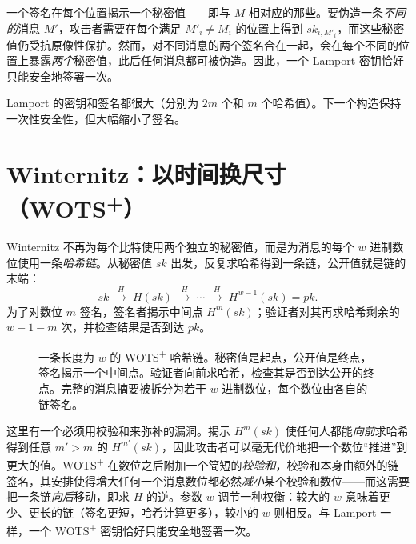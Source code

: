 \begin{remark}[为何它严格只能使用一次]
一个签名在每个位置揭示一个秘密值——即与 $M$ 相对应的那些。要伪造一条\emph{不同的}消息 $M'$，攻击者需要在每个满足 $M'_i\neq M_i$ 的位置上得到 $sk_{i,M'_i}$，而这些秘密值仍受抗原像性保护。然而，对不同消息的两个签名合在一起，会在每个不同的位置上暴露\emph{两个}秘密值，此后任何消息都可被伪造。因此，一个 Lamport 密钥恰好只能安全地签署一次。
\end{remark}

Lamport 的密钥和签名都很大（分别为 $2m$ 个和 $m$ 个哈希值）。下一个构造保持一次性安全性，但大幅缩小了签名。

\section{Winternitz：以时间换尺寸（WOTS\textsuperscript{+}）}
Winternitz 不再为每个比特使用两个独立的秘密值，而是为消息的每个 $w$ 进制数位使用一条\emph{哈希链}。从秘密值 $sk$ 出发，反复求哈希得到一条链，公开值就是链的末端：
\[
sk \;\xrightarrow{H}\; H(sk) \;\xrightarrow{H}\; \cdots \;\xrightarrow{H}\; H^{w-1}(sk)=pk.
\]
为了对数位 $m$ 签名，签名者揭示中间点 $H^{m}(sk)$；验证者对其再求哈希剩余的 $w-1-m$ 次，并检查结果是否到达 $pk$。

\begin{figure}[H]
\centering
{}
\caption{一条长度为 $w$ 的 WOTS\textsuperscript{+} 哈希链。秘密值是起点，公开值是终点，签名揭示一个中间点。验证者向前求哈希，检查其是否到达公开的终点。完整的消息摘要被拆分为若干 $w$ 进制数位，每个数位由各自的链签名。}
\label{fig:wots-chain}
\end{figure}

这里有一个必须用校验和来弥补的漏洞。揭示 $H^m(sk)$ 使任何人都能\emph{向前}求哈希得到任意 $m'>m$ 的 $H^{m'}(sk)$，因此攻击者可以毫无代价地把一个数位“推进”到更大的值。WOTS\textsuperscript{+} 在数位之后附加一个简短的\emph{校验和}，校验和本身由额外的链签名，其安排使得增大任何一个消息数位都必然\emph{减小}某个校验和数位——而这需要把一条链\emph{向后}移动，即求 $H$ 的逆。参数 $w$ 调节一种权衡：较大的 $w$ 意味着更少、更长的链（签名更短，哈希计算更多），较小的 $w$ 则相反。与 Lamport 一样，一个 WOTS\textsuperscript{+} 密钥恰好只能安全地签署一次。

